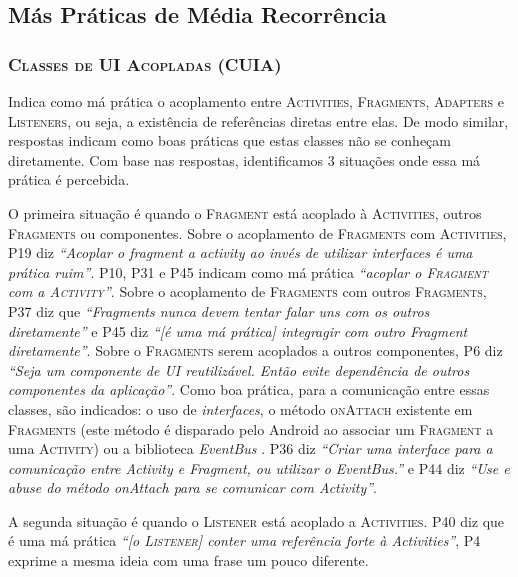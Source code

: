 \subsection{Más Práticas de Média Recorrência}

\subsubsection{\textsc{Classes de UI Acopladas (CUIA)}}
Indica como má prática o acoplamento entre \textsc{Activities}, \textsc{Fragments}, \textsc{Adapters} e \textsc{Listeners}, ou seja, a existência de referências diretas entre elas. De modo similar, respostas indicam como boas práticas que estas classes não se conheçam diretamente. Com base nas respostas, identificamos 3 situações onde essa má prática é percebida.

O primeira situação é quando o \textsc{Fragment} está acoplado à \textsc{Activities}, outros \textsc{Fragments} ou componentes. Sobre o acoplamento de \textsc{Fragments} com \textsc{Activities}, P19 diz \textit{``Acoplar o fragment a activity ao invés de utilizar interfaces é uma prática ruim''}. P10, P31 e P45 indicam como má prática \textit{``acoplar o \textsc{Fragment} com a \textsc{Activity}''}. Sobre o acoplamento de \textsc{Fragments} com outros \textsc{Fragments}, P37 diz que \textit{``Fragments nunca devem tentar falar uns com os outros diretamente''} e P45 diz \textit{``[é uma má prática] integragir com outro Fragment diretamente''}. Sobre o \textsc{Fragments} serem acoplados a outros componentes, P6 diz \textit{``Seja um componente de UI reutilizável. Então evite dependência de outros componentes da aplicação''}. Como boa prática, para a comunicação entre essas classes, são indicados: o uso de \textit{interfaces}, o método \textsc{onAttach} existente em \textsc{Fragments} (este método é disparado pelo Android ao associar um \textsc{Fragment} a uma \textsc{Activity}) ou a biblioteca \textit{EventBus} \cite{EventBusAndroid}. P36 diz \textit{``Criar uma interface para a comunicação entre Activity e Fragment, ou utilizar o EventBus.''} e P44 diz \textit{``Use e abuse do método onAttach para se comunicar com Activity''}. 

A segunda situação é quando o \textsc{Listener} está acoplado a \textsc{Activities}. P40 diz que é uma má prática \textit{``[o \textsc{Listener}] conter uma referência forte à Activities''}, P4 exprime a mesma ideia com uma frase um pouco diferente. 

